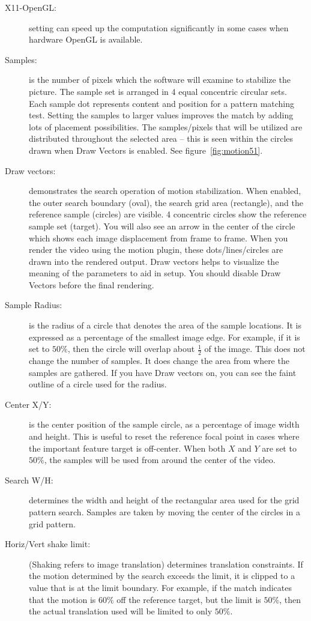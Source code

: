 \begin{description}
    \item[X11-OpenGL:] setting can speed up the computation significantly in some cases when hardware OpenGL is available.
    \item[Samples:] is the number of pixels which the software will examine to stabilize the picture. The sample set is arranged in 4 equal concentric circular sets. Each sample dot represents content and position for a pattern matching test. Setting the samples to larger values improves the match by adding lots of placement possibilities. The samples/pixels that will be utilized are distributed throughout the selected area -- this is seen within the circles drawn when Draw Vectors is enabled. See figure~\ref{fig:motion51}.
    \item[Draw vectors:] demonstrates the search operation of motion stabilization. When enabled, the outer search boundary (oval), the search grid area (rectangle), and the reference sample (circles) are visible. 4 concentric circles show the reference sample set (target). You will also see an arrow in the center of the circle which shows each image displacement from frame to frame. When you render the video using the motion plugin, these dots/lines/circles are drawn into the rendered output. Draw vectors helps to visualize the meaning of the parameters to aid in setup. You should disable Draw Vectors before the final rendering.
    \item[Sample Radius:] is the radius of a circle that denotes the area of the sample locations. It is expressed as a percentage of the smallest image edge. For example, if it is set to $50\%$, then the circle will overlap about $\frac{1}{2}$ of the image. This does not change the number of samples. It does change the area from where the samples are gathered. If you have Draw vectors on, you can see the faint outline of a circle used for the radius.
    \item[Center X/Y:] is the center position of the sample circle, as a percentage of image width and height.
    This is useful to reset the reference focal point in cases where the important feature target is off-center.
    When both $X$ and $Y$ are set to $50\%$, the samples will be used from around the center of the video.
    \item[Search W/H:] determines the width and height of the rectangular area used for the grid pattern search. Samples are taken by moving the center of the circles in a grid pattern.
    \item[Horiz/Vert shake limit:] (Shaking refers to image translation) determines translation constraints. If the motion determined by the search exceeds the limit, it is clipped to a value that is at the limit boundary. For example, if the match indicates that the motion is $60\%$ off the reference target, but the limit is $50\%$, then the actual translation used will be limited to only $50\%$.

\end{description}
